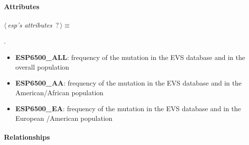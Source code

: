 \paragraph{Attributes}      

	\begin{flushleft} \small
\begin{minipage}{\linewidth}\label{scrap12}\raggedright\small
{} $\langle\,${\itshape {esp's attributes}}\nobreak\ {\footnotesize {?}}$\,\rangle\equiv$
\vspace{-1ex}
\begin{list}{}{} \item

                
        {\NWsep}
\end{list}
\vspace{-1.5ex}
\footnotesize
\begin{list}{}{\setlength{\itemsep}{-\parsep}\setlength{\itemindent}{-\leftmargin}}
\item {\NWtxtMacroNoRef}.

\item{}
\end{list}
\end{minipage}\vspace{4ex}
\end{flushleft}
\begin{itemize}
 	\item \textbf{ESP6500\_ALL}: frequency of the mutation in the EVS database and in the overall population
 	\item \textbf{ESP6500\_AA}: frequency of the mutation in the EVS database and in the American/African population
 	\item \textbf{ESP6500\_EA}: frequency of the mutation in the EVS database and in the European /American population
\end{itemize}

\paragraph{Relationships} 

